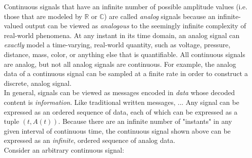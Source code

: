 Continuous signals that have an infinite number of possible amplitude values (i.e. those that are modeled by $\mathbb{R}$ or $\mathbb{C}$) are called \textit{analog} signals because an infinite-valued output can be viewed as \textit{analogous} to the seemingly infinite complexity of real-world phenomena. At any instant in its time domain, an analog signal can \textit{exactly} model a time-varying, real-world quantity, such as voltage, pressure, distance, mass, color, or anything else that is quantifiable. All continuous signals are analog, but not all analog signals are continuous. For example, the analog data of a continuous signal can be sampled at a finite rate in order to construct a discrete, analog signal. \\


In general, signals can be viewed as messages encoded in \textit{data} whose decoded content is \textit{information}. Like traditional written messages, ... Any signal can be expressed as an ordered sequence of data, each of which can be expressed as a tuple $(t,A(t))$. Because there are an infinite number of "instants" in any given interval of continuous time, the continuous signal shown above can be expressed as an \textit{infinite}, ordered sequence of analog data. \\


Consider an arbitrary continuous signal:


\begin{center}
\end{center}

